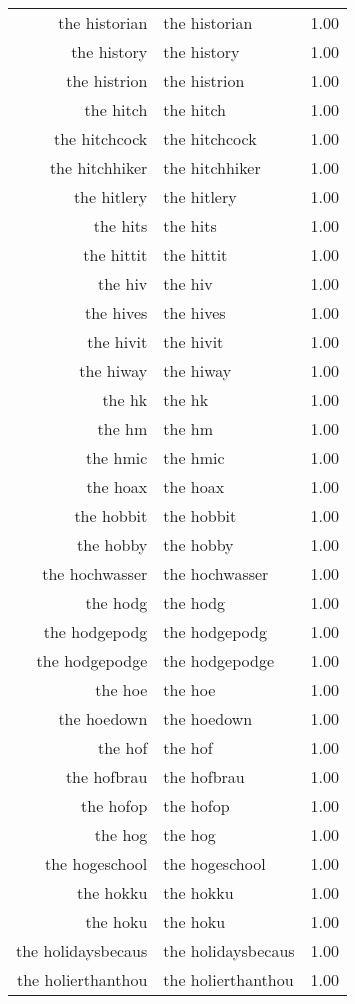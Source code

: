\begin{table}[ht]
\begin{tabular}{rlr}
  the historian & the historian & 1.00 \\ 
  the history & the history & 1.00 \\ 
  the histrion & the histrion & 1.00 \\ 
  the hitch & the hitch & 1.00 \\ 
  the hitchcock & the hitchcock & 1.00 \\ 
  the hitchhiker & the hitchhiker & 1.00 \\ 
  the hitlery & the hitlery & 1.00 \\ 
  the hits & the hits & 1.00 \\ 
  the hittit & the hittit & 1.00 \\ 
  the hiv & the hiv & 1.00 \\ 
  the hives & the hives & 1.00 \\ 
  the hivit & the hivit & 1.00 \\ 
  the hiway & the hiway & 1.00 \\ 
  the hk & the hk & 1.00 \\ 
  the hm & the hm & 1.00 \\ 
  the hmic & the hmic & 1.00 \\ 
  the hoax & the hoax & 1.00 \\ 
  the hobbit & the hobbit & 1.00 \\ 
  the hobby & the hobby & 1.00 \\ 
  the hochwasser & the hochwasser & 1.00 \\ 
  the hodg & the hodg & 1.00 \\ 
  the hodgepodg & the hodgepodg & 1.00 \\ 
  the hodgepodge & the hodgepodge & 1.00 \\ 
  the hoe & the hoe & 1.00 \\ 
  the hoedown & the hoedown & 1.00 \\ 
  the hof & the hof & 1.00 \\ 
  the hofbrau & the hofbrau & 1.00 \\ 
  the hofop & the hofop & 1.00 \\ 
  the hog & the hog & 1.00 \\ 
  the hogeschool & the hogeschool & 1.00 \\ 
  the hokku & the hokku & 1.00 \\ 
  the hoku & the hoku & 1.00 \\ 
  the holidaysbecaus & the holidaysbecaus & 1.00 \\ 
  the holierthanthou & the holierthanthou & 1.00 \\ 

\end{tabular}
\end{table}

